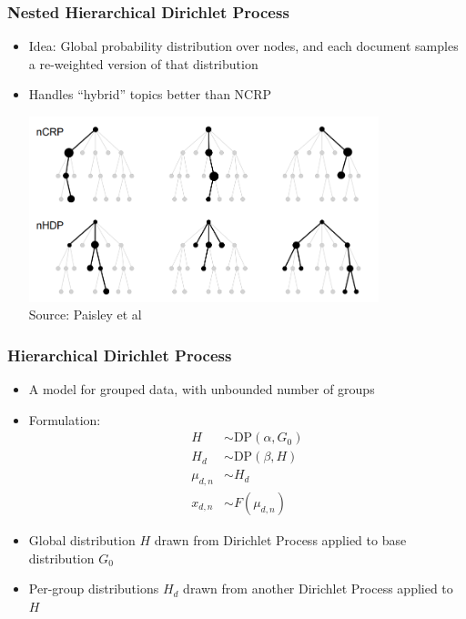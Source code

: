 \begin{frame}
\begin{center}
\end{center}
\end{frame}

\begin{frame}
\frametitle{Nested Hierarchical Dirichlet Process}
\begin{itemize}[<+->]
\item Idea: Global probability distribution over nodes, and each document samples a re-weighted version of that distribution
\item Handles ``hybrid'' topics better than NCRP
\begin{center}
\includegraphics[width=0.8\textwidth]{../figures/ncrp_vs_nhdp.png} \\
{\tiny Source: Paisley et al \cite{paisley2015nhdp}}
\end{center}
\end{itemize}
\end{frame}

\begin{frame}
\frametitle{Hierarchical Dirichlet Process}
\begin{itemize}[<+->]
\item A model for grouped data, with unbounded number of groups
\item Formulation:
\begin{align*}
H &\sim \text{DP}(\alpha, G_0) \\
H_d &\sim \text{DP}(\beta, H) \\
\mu_{d,n} &\sim H_d \\
x_{d,n} &\sim F(\mu_{d,n})
\end{align*}
\item Global distribution $H$ drawn from Dirichlet Process applied to base distribution $G_0$
\item Per-group distributions $H_d$ drawn from another Dirichlet Process applied to $H$
\end{itemize}
\end{frame}

